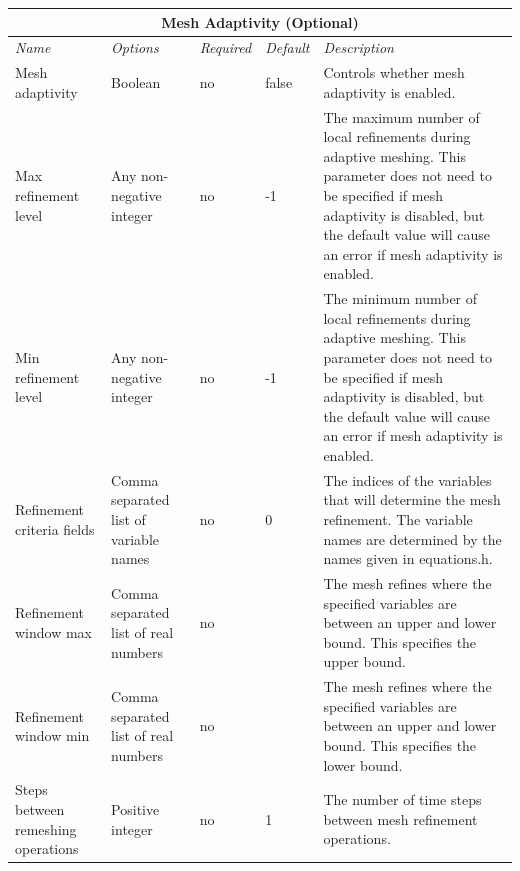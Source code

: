 \documentclass[10pt]{article} %
\begin{document}
\begin{center}
    \begin{tabular}{ | p{} | p{} | p{} | p{} | p{} |}
    \hline
      \multicolumn{5}{|c|}{\textbf{Mesh Adaptivity (Optional)}} \\
    \hline
    \hline
    \emph{Name} & \emph{Options} & \emph{Required} & \emph{Default} & \emph{Description} \\ \hline
    Mesh adaptivity & Boolean & no & false & Controls whether mesh adaptivity is enabled. \\ \hline
     Max refinement level & Any non-negative integer & no & -1 & The maximum number of local refinements during adaptive meshing. This parameter does not need to be specified if mesh adaptivity is disabled, but the default value will cause an error if mesh adaptivity is enabled. \\ \hline
      Min refinement level & Any non-negative integer & no & -1 & The minimum number of local refinements during adaptive meshing. This parameter does not need to be specified if mesh adaptivity is disabled, but the default value will cause an error if mesh adaptivity is enabled. \\ \hline
      Refinement criteria fields & Comma separated list of variable names & no & 0 & The indices of the variables that will determine the mesh refinement. The variable names are determined by the names given in equations.h.  \\ \hline
      Refinement window max & Comma separated list of real numbers & no &  & The mesh refines where the specified variables are between an upper and lower bound. This specifies the upper bound.  \\ \hline
        Refinement window min & Comma separated list of real numbers & no &  & The mesh refines where the specified variables are between an upper and lower bound. This specifies the lower bound.  \\ \hline
               Steps between remeshing operations & Positive integer & no & 1 & The number of time steps between mesh refinement operations. \\ \hline
    \end{tabular}
\end{center}
\end{document}

